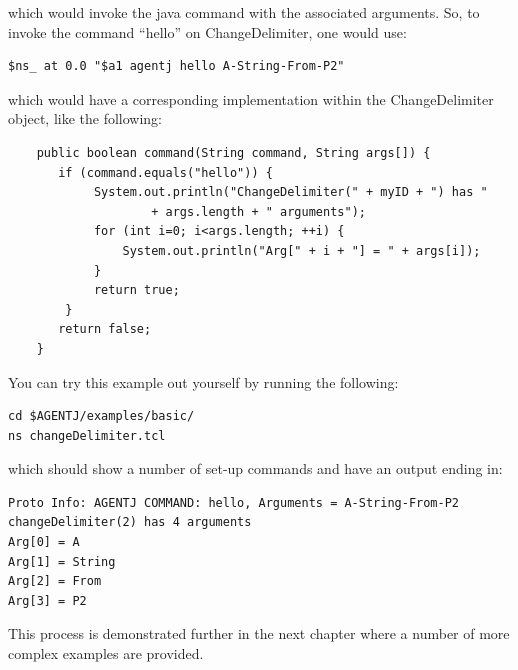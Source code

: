  \noindent which would invoke the java command with the associated
 arguments. So, to invoke the command ``hello'' on ChangeDelimiter, 
 one would use:
 
 \footnotesize
 \begin{verbatim}
$ns_ at 0.0 "$a1 agentj hello A-String-From-P2" 
 \end{verbatim}
 \normalsize

which would have a corresponding implementation within the ChangeDelimiter object, like the following:

 \footnotesize
 \begin{verbatim}
    public boolean command(String command, String args[]) {
       if (command.equals("hello")) {
            System.out.println("ChangeDelimiter(" + myID + ") has "
                    + args.length + " arguments");
            for (int i=0; i<args.length; ++i) {
                System.out.println("Arg[" + i + "] = " + args[i]);
            }
            return true;
        }
       return false;
    }
 \end{verbatim}
 \normalsize

You can try this example out yourself by running the following:


 \footnotesize
 \begin{verbatim}
cd $AGENTJ/examples/basic/
ns changeDelimiter.tcl
 \end{verbatim}
 \normalsize

which should show a number of set-up commands and have an output ending in:

\footnotesize
\begin{verbatim}
Proto Info: AGENTJ COMMAND: hello, Arguments = A-String-From-P2
changeDelimiter(2) has 4 arguments
Arg[0] = A
Arg[1] = String
Arg[2] = From
Arg[3] = P2
 \end{verbatim}
 \normalsize

This process is demonstrated further in the next chapter where a number of more complex examples are provided.



 
